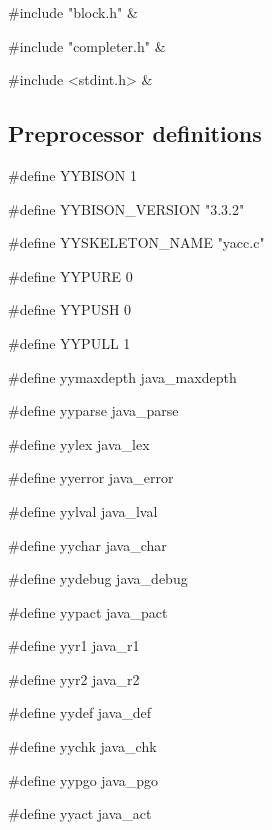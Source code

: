 \medskip
\begin{cxreftabi}
{\stt \#include "block.h"} &\\
\end{cxreftabi}

\medskip
\begin{cxreftabi}
{\stt \#include "completer.h"} &\\
\end{cxreftabi}

\medskip
\begin{cxreftabi}
{\stt \#include <stdint.h>} &\\
\end{cxreftabi}


\subsection*{Preprocessor definitions}

{\stt \#define YYBISON 1}

\medskip
{\stt \#define YYBISON\_VERSION "3.3.2"}

\medskip
{\stt \#define YYSKELETON\_NAME "yacc.c"}

\medskip
{\stt \#define YYPURE 0}

\medskip
{\stt \#define YYPUSH 0}

\medskip
{\stt \#define YYPULL 1}

\medskip
{\stt \#define yymaxdepth java\_maxdepth}

\medskip
{\stt \#define yyparse java\_parse}

\medskip
{\stt \#define yylex java\_lex}

\medskip
{\stt \#define yyerror java\_error}

\medskip
{\stt \#define yylval java\_lval}

\medskip
{\stt \#define yychar java\_char}

\medskip
{\stt \#define yydebug java\_debug}

\medskip
{\stt \#define yypact java\_pact}

\medskip
{\stt \#define yyr1 java\_r1}

\medskip
{\stt \#define yyr2 java\_r2}

\medskip
{\stt \#define yydef java\_def}

\medskip
{\stt \#define yychk java\_chk}

\medskip
{\stt \#define yypgo java\_pgo}

\medskip
{\stt \#define yyact java\_act}

